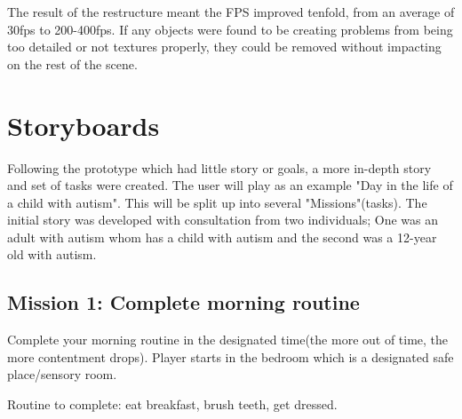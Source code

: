 The result of the restructure meant the FPS improved tenfold, from an average of 30fps to 200-400fps. If any objects were found to be creating problems from being too detailed or not textures properly, they could be removed without impacting on the rest of the scene.

\section{Storyboards}
Following the prototype which had little story or goals, a more in-depth story and set of tasks were created. The user will play as an example "Day in the life of a child with autism". This will be split up into several "Missions"(tasks). The initial story was developed with consultation from two individuals; One was an adult with autism whom has a child with autism and the second was a 12-year old with autism.

\subsection*{Mission 1: Complete morning routine}
Complete your morning routine in the designated time(the more out of time, the more contentment drops). Player starts in the bedroom which is a designated safe place/sensory room. 

Routine to complete: eat breakfast, brush teeth, get dressed.


